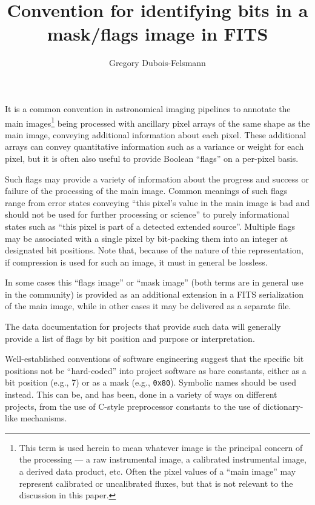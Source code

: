 \documentclass[DM,authoryear,toc]{lsstdoc}
\title{Convention for identifying bits in a mask/flags image in FITS}
\author{%
Gregory Dubois-Felsmann
}
\date{\vcsDate}
\begin{document}
\maketitle


It is a common convention in astronomical imaging pipelines to annotate the
main images\footnote{This term is used herein to mean whatever image is the
principal concern of the processing --- a raw instrumental image, a
calibrated instrumental image, a derived data product, etc.
Often the pixel values of a ``main image'' may represent calibrated or
uncalibrated fluxes, but that is not relevant to the discussion in this paper.}
being processed with ancillary pixel arrays of the same shape
as the main image, conveying additional information about each pixel.
These additional arrays can convey quantitative information such as a
variance or weight for each pixel, but it is often also useful to provide
Boolean ``flags'' on a per-pixel basis.

Such flags may provide a variety of information about the progress and
success or failure of the processing of the main image.
Common meanings of such flags range from error states conveying ``this
pixel's value in the main image is bad and should not be used for
further processing or science'' to purely informational states such as
``this pixel is part of a detected extended source''.
Multiple flags may be associated with a single pixel by bit-packing
them into an integer at designated bit positions.
Note that, because of the nature of thie representation, if compression
is used for such an image, it must in general be lossless.

In some cases this ``flags image'' or ``mask image'' (both terms are in
general use in the community) is provided as an additional extension in
a FITS serialization of the main image, while in other cases it may be
delivered as a separate file.

The data documentation for projects that provide such data will generally
provide a list of flags by bit position and purpose or interpretation.

Well-established conventions of software engineering suggest that the
specific bit positions not be ``hard-coded'' into project software as
bare constants, either as a bit position (e.g., 7) or as a mask (e.g.,
\verb|0x80|).
Symbolic names should be used instead.
This can be, and has been, done in a variety of ways on different
projects, from the use of C-style preprocessor constants to the use of
dictionary-like mechanisms.
\end{document}

